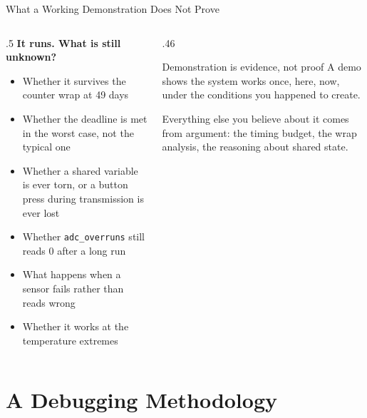 \documentclass[9pt,aspectratio=169,xcolor=table]{beamer}
\begin{document}
\begin{frame}{What a Working Demonstration Does Not Prove}
    \begin{columns}[T]
    \begin{column}{.5\textwidth}
        \textbf{It runs. What is still unknown?}
        {\small
        \begin{itemize}\itemsep1pt
            \item Whether it survives the \alert{counter wrap} at 49 days
            \item Whether the deadline is met in the \alert{worst case}, not the
                  typical one
            \item Whether a shared variable is ever \alert{torn}, or a button press during transmission is ever \alert{lost}
            \item Whether \texttt{adc\_overruns} still reads \alert{0} after a long run
            \item What happens when a sensor \alert{fails} rather than reads wrong
            \item Whether it works at the \alert{temperature extremes}
        \end{itemize}}
    \end{column}
    \begin{column}{.46\textwidth}
        \begin{block}{Demonstration is evidence, not proof}
            A demo shows the system works \alert{once, here, now}, under the
            conditions you happened to create.

            \vspace{2mm}
            Everything else you believe about it comes from \alert{argument}: the
            timing budget, the wrap analysis, the reasoning about shared state.
        \end{block}
    \end{column}
    \end{columns}
\end{frame}


\section{A Debugging Methodology}
\end{document}
